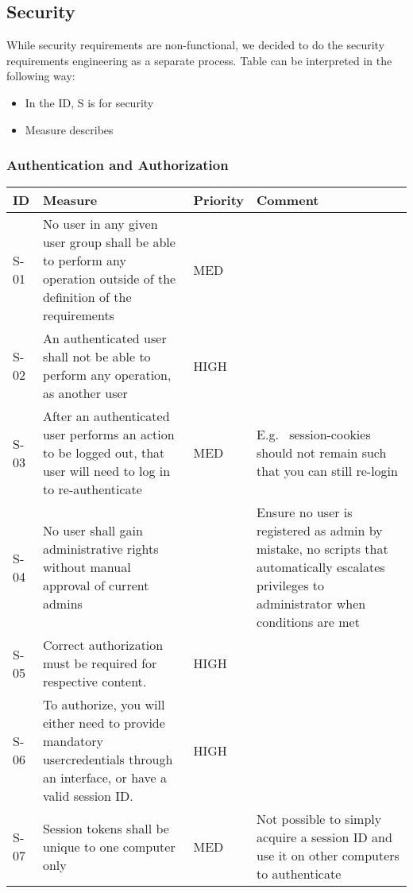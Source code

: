 \subsection{Security}
While security requirements are non-functional, we decided to do the
security requirements engineering as a separate process. 
Table %
can be interpreted in the following way:
\begin{itemize}
    \item In the ID, S is for security
    \item Measure describes 
\end{itemize}

\subsubsection{Authentication and Authorization}
\begin{supertabular}{|l|p{7cm}|l|p{5cm}|}
\hline
\textbf{ID} & \textbf{Measure} & \textbf{Priority} & \textbf{Comment} \\ 
\hline

S-01 & No user in any given user group shall be able to perform any operation
outside of the definition of the requirements & MED & \\ 
\hline

S-02 & An authenticated user shall not be able to perform any operation,
as another user & HIGH & \\ 
\hline

S-03 & After an authenticated user performs an action to be logged out,
that user will need to log in to re-authenticate & MED & E.g. \ session-cookies
should not remain such that you can still re-login\\ 
\hline

S-04 & No user shall gain administrative rights without manual approval
of current admins & & Ensure no user is registered as admin by mistake,
no scripts that automatically escalates privileges to administrator when
conditions are met\\ 
\hline

S-05 & Correct authorization must be required for respective content. & HIGH &\\ 
\hline

S-06 & To authorize, you will either need to provide mandatory usercredentials
through an interface, or have a valid session ID. & HIGH & \\ 
\hline

S-07 & Session tokens shall be unique to one computer only & MED & Not possible to
simply acquire a session ID and use it on other computers to authenticate\\
\hline

\end{supertabular}

